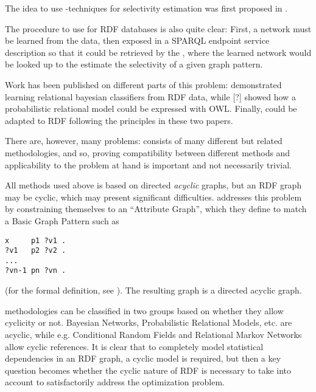 The idea to use \SRL-techniques for selectivity estimation was first
proposed in \cite{selectivityPRM}.

The procedure to use \SRL{} for RDF databases is also quite clear: First,
a network must be learned from the data, then exposed in a SPARQL
endpoint service description so that it could be retrieved by the
\fedeng{}, where the learned network would be looked up to the
estimate the selectivity of a given graph pattern.

Work has been published on different parts of this problem:
\cite{Lin:2011:LRB:2063016.2063042} demonstrated learning relational
bayesian classifiers from RDF data, while [?] 
showed how a probabilistic  relational model could be expressed with
OWL. Finally,  \cite{selectivityPRM} could be adapted to RDF following
the principles in these two papers.

There are, however, many problems: \SRL{} consists of many different
but related methodologies, and so, proving compatibility between
different methods and applicability to the problem at hand is
important and not necessarily trivial.

All methods used above is based on directed \emph{acyclic} graphs, but
an RDF graph may be cyclic, which may present significant
difficulties. \cite{Lin:2011:LRB:2063016.2063042} addresses this
problem by constraining themselves to an ``Attribute Graph'', which
they define to match a Basic Graph Pattern such as
\begin{verbatim}
x     p1 ?v1 .
?v1   p2 ?v2 .
...
?vn-1 pn ?vn .
\end{verbatim}
(for the formal definition, see
\cite{Lin:2011:LRB:2063016.2063042}). The resulting graph is a
directed acyclic graph.

\SRL{} methodologies can be classified in two groups based on whether
they allow cyclicity or not. Bayesian Networks, Probabilistic
Relational Models, etc. are acyclic, while e.g. Conditional Random
Fields and Relational Markov Networks allow cyclic references. It is
clear that to completely model statistical dependencies in an RDF
graph, a cyclic model is required, but then a key question becomes
whether the cyclic nature of RDF is necessary to take into account to
satisfactorily address the optimization problem. 